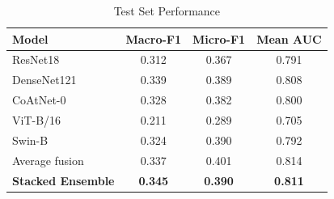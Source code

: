 \begin{table}[t]
\caption{Test Set Performance}
\label{tab:test}
\centering
\begin{tabular}{lccc}
\toprule
Model & Macro-F1 & Micro-F1 & Mean AUC \\
\midrule
ResNet18 & 0.312 & 0.367 & 0.791 \\
DenseNet121 & 0.339 & 0.389 & 0.808 \\
CoAtNet-0 & 0.328 & 0.382 & 0.800 \\
ViT-B/16 & 0.211 & 0.289 & 0.705 \\
Swin-B & 0.324 & 0.390 & 0.792 \\
\midrule
Average fusion & 0.337 & 0.401 & 0.814 \\
\textbf{Stacked Ensemble} & \textbf{0.345} & \textbf{0.390} & \textbf{0.811} \\
\bottomrule
\end{tabular}
\end{table}
